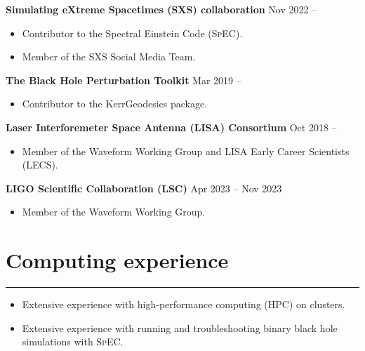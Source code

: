\documentclass[10.5pt, oneside]{article}   	%
\begin{document}
{\bf Simulating eXtreme Spacetimes (SXS) collaboration}  \hfill Nov 2022 -- \\
\vspace{-5mm}
\begin{itemize}
\item Contributor to the Spectral Einstein Code (\textsc{SpEC}).
\item Member of the SXS Social Media Team.
\end{itemize} 
{\bf The Black Hole Perturbation Toolkit}  \hfill Mar 2019 -- \\
\vspace{-5mm}
\begin{itemize}
\item Contributor to the KerrGeodesics package.
\end{itemize}
{\bf Laser Interforemeter Space Antenna (LISA) Consortium}  \hfill Oct 2018 -- \\
\vspace{-5mm}
\begin{itemize}
\item Member of the Waveform Working Group and LISA Early Career Scientists (LECS).
\end{itemize} 
{\bf LIGO Scientific Collaboration (LSC)}  \hfill Apr 2023 -- Nov 2023 \\
\vspace{-5mm}
\begin{itemize}
\item Member of the Waveform Working Group.
\end{itemize} 


 {\color{Sectioncolour}
\section*{Computing experience}
\vspace{-3mm}
\noindent\rule{\linewidth}{0.6pt}}

\begin{itemize}
\item Extensive experience with high-performance computing (HPC) on clusters.
\item Extensive experience with running and troubleshooting binary black hole simulations with \textsc{SpEC}.
\end{itemize}
\end{document}
